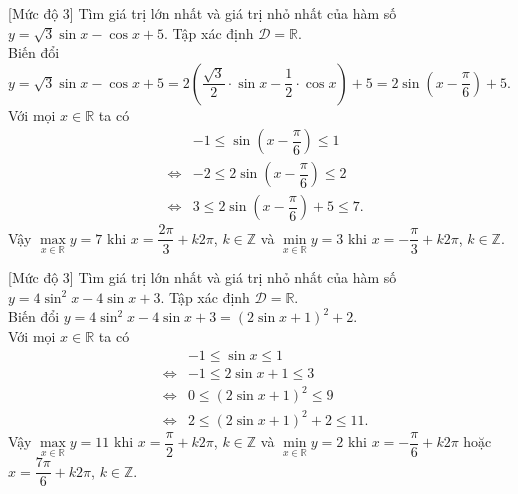 \begin{bt}%
	[Mức độ 3]
	Tìm giá trị lớn nhất và giá trị nhỏ nhất của hàm số $y=\sqrt{3} \sin x-\cos x+5$.
	\loigiai
	{
		Tập xác định $\mathscr{D}=\mathbb{R}$.\\
		Biến đổi $y=\sqrt{3} \sin x-\cos x+5=2\left(\dfrac{\sqrt{3}}{2}\cdot\sin x-\dfrac{1}{2}\cdot\cos x\right)+5=2\sin\left(x-\dfrac{\pi}{6}\right)+5$.\\
		Với mọi $x\in \mathbb{R}$ ta có
		\allowdisplaybreaks
		\begin{eqnarray*}
			& & -1\leq \sin\left(x-\dfrac{\pi}{6}\right)\leq 1\\
			&\Leftrightarrow& -2\leq 2\sin\left(x-\dfrac{\pi}{6}\right)\leq 2\\
			&\Leftrightarrow&3\leq  2\sin\left(x-\dfrac{\pi}{6}\right)+5\leq 7.
		\end{eqnarray*}
		Vậy $\max\limits_{x \in \mathbb{R}} y=7$ khi $x=\dfrac{2\pi}{3}+k2\pi$, $k\in \mathbb{Z}$ và $\min\limits_{x \in \mathbb{R}} y=3$ khi $x=-\dfrac{\pi}{3}+k2\pi$, $k\in \mathbb{Z}$.
	}
\end{bt}

\begin{bt}%
	[Mức độ 3]
	Tìm giá trị lớn nhất và giá trị nhỏ nhất của hàm số  $y=4 \sin^2 x-4 \sin x+3$.
	\loigiai
	{
		Tập xác định $\mathscr{D}=\mathbb{R}$.\\
		Biến đổi $y=4 \sin^2 x-4 \sin x+3=\left(2\sin x+1\right)^2+2$.\\
		Với mọi $x\in \mathbb{R}$ ta có
		\allowdisplaybreaks
		\begin{eqnarray*}
			& & -1\leq \sin x\leq 1\\
			&\Leftrightarrow& -1\leq 2\sin x+1\leq 3\\
			&\Leftrightarrow&0\leq \left( 2\sin x+1\right)^2\leq 9\\
			&\Leftrightarrow&2\leq \left( 2\sin x+1\right)^2+2\leq 11.
		\end{eqnarray*}
		Vậy $\max\limits_{x \in \mathbb{R}} y=11$ khi $x=\dfrac{\pi}{2}+k2\pi$, $k\in \mathbb{Z}$ và $\min\limits_{x \in \mathbb{R}} y=2$ khi $x=-\dfrac{\pi}{6}+k2\pi$ hoặc $x=\dfrac{7\pi}{6}+k2\pi$, $k\in \mathbb{Z}$.
	}
\end{bt}

